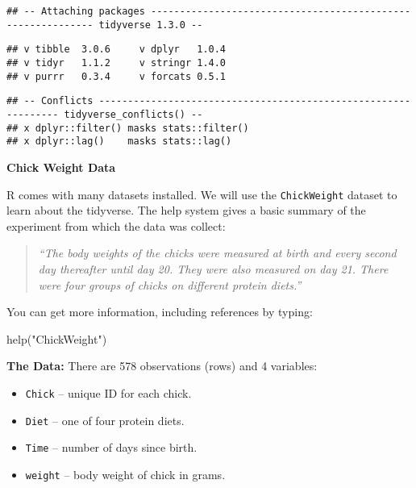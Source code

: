 \documentclass[
]{book}
\newenvironment{Shaded}{\begin{snugshade}}{\end{snugshade}}
\newcommand{\FunctionTok}[1]{\textcolor[rgb]{0.00,0.00,0.00}{#1}}
\newcommand{\NormalTok}[1]{#1}
\newcommand{\StringTok}[1]{\textcolor[rgb]{0.31,0.60,0.02}{#1}}
\providecommand{\tightlist}{%
  \setlength{\itemsep}{0pt}\setlength{\parskip}{0pt}}
\begin{document}
\begin{verbatim}
## -- Attaching packages ------------------------------------------------------------ tidyverse 1.3.0 --
\end{verbatim}

\begin{verbatim}
## v tibble  3.0.6     v dplyr   1.0.4
## v tidyr   1.1.2     v stringr 1.4.0
## v purrr   0.3.4     v forcats 0.5.1
\end{verbatim}

\begin{verbatim}
## -- Conflicts --------------------------------------------------------------- tidyverse_conflicts() --
## x dplyr::filter() masks stats::filter()
## x dplyr::lag()    masks stats::lag()
\end{verbatim}

\textbf{Chick Weight Data}

R comes with many datasets installed. We will use the \texttt{ChickWeight} dataset
to learn about the tidyverse. The help system gives a basic summary of the experiment from
which the data was collect:

\begin{quote}
\emph{``The body weights of the chicks were measured at birth and every second day thereafter
until day 20. They were also measured on day 21. There were four groups of chicks on
different protein diets.''}
\end{quote}

You can get more information, including references by typing:

\begin{Shaded}
\begin{Highlighting}[]
\FunctionTok{help}\NormalTok{(}\StringTok{"ChickWeight"}\NormalTok{)}
\end{Highlighting}
\end{Shaded}

\textbf{The Data: }
There are 578 observations (rows) and 4 variables:

\begin{itemize}
\tightlist
\item
  \texttt{Chick} -- unique ID for each chick.
\item
  \texttt{Diet} -- one of four protein diets.
\item
  \texttt{Time} -- number of days since birth.
\item
  \texttt{weight} -- body weight of chick in grams.
\end{itemize}
\end{document}
